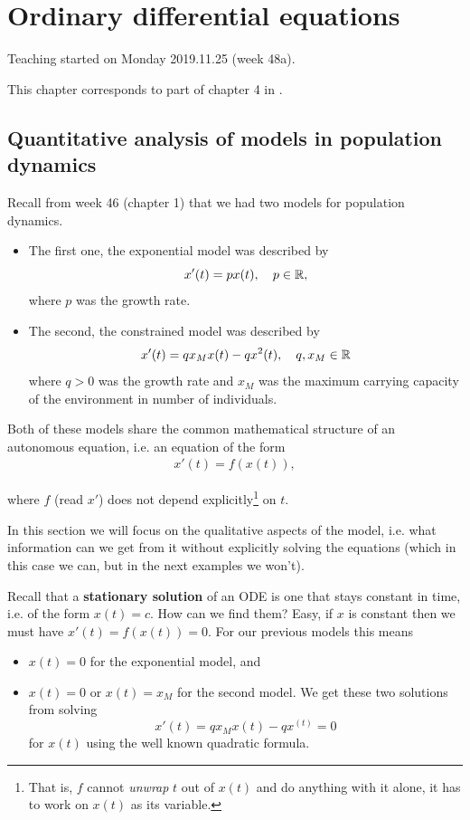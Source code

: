 \chapter{Ordinary differential equations}

Teaching started on Monday 2019.11.25 (week 48a).

This chapter corresponds to part of chapter 4 in \cite{eck2017mathematical}.

\section{Quantitative analysis of models in population dynamics}

Recall from week 46 (chapter 1) that we had two models for population dynamics.

\begin{itemize}
  \item The first one, the exponential model was described by
    \[
      x'(t) = px(t),\quad p \in \mathbb{R},
    \]
    where $p$ was the growth rate.
  \item The second, the constrained model was described by
    \[
      x'(t) = qx_M x(t) - q x^2(t),\quad q, x_M \in \mathbb{R}
    \]
    where $q > 0$ was the growth rate and $x_M$ was the maximum carrying
    capacity of the environment in number of individuals.
\end{itemize}

Both of these models share the common mathematical structure of an autonomous
equation, i.e. an equation of the form
\begin{align}
  \label{eq:autonomous-ode}
  x'(t) = f(x(t)),
\end{align}

where $f$ (read $x'$) does not depend explicitly\footnote{That is, $f$ cannot
\textit{unwrap} $t$ out of $x(t)$ and do anything with it alone, it has to work
on $x(t)$ as its variable.} on $t$.

In this section we will focus on the qualitative aspects of the model, i.e.
what information can we get from it without explicitly solving the equations
(which in this case we can, but in the next examples we won't).

Recall that a \textbf{stationary solution} of an ODE is one that stays constant
in time, i.e. of the form $x(t) = c$. How can we find them? Easy, if $x$ is
constant then we must have $x'(t) = f(x(t)) = 0$. For our previous models this means
\begin{itemize}
  \item $x(t) = 0$ for the exponential model, and
  \item $x(t) = 0$ or $x(t) = x_M$ for the second model. We get these two
    solutions from solving
    \[
      x'(t) = qx_M x(t) - qx^(t) = 0
    \]
    for $x(t)$ using the well known quadratic formula.
\end{itemize}

